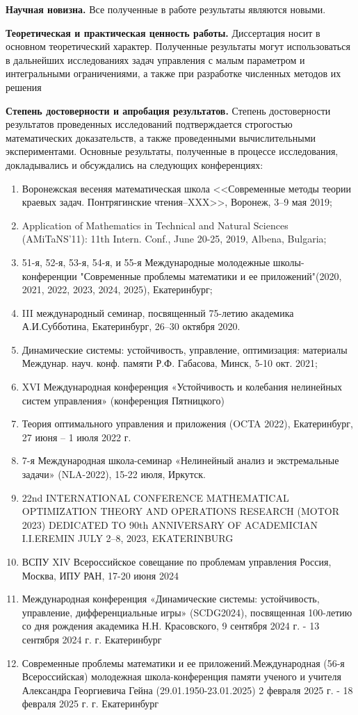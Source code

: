 \documentclass[../main.tex]{subfiles}
\begin{document}
\textbf{Научная новизна.} Все полученные в работе результаты являются новыми.

\textbf{Теоретическая и практическая ценность работы.} Диссертация носит в основном теоретический характер.
Полученные результаты могут использоваться в дальнейших исследованиях задач управления с малым параметром и интегральными ограничениями, а также при разработке численных методов их решения

\textbf{Степень достоверности и апробация результатов.}  Степень достоверности результатов проведенных исследований подтверждается строгостью математических доказательств, а также проведенными вычислительными экспериментами.
Основные результаты, полученные в процессе исследования, докладывались и обсуждались на следующих конференциях:
\begin{enumerate}
	\item Воронежская весеняя математическая школа <<Современные методы теории краевых задач. Понтрягинские чтения–XXX>>, Воронеж, 3–9 мая 2019;
	\item Application of Mathematics in Technical and Natural Sciences (AMiTaNS'11): 11th Intern. Conf., June 20-25, 2019, Albena, Bulgaria;
	\item 51-я, 52-я, 53-я, 54-я, и 55-я Международные молодежные школы-конференции "Современные проблемы математики и ее приложений"(2020, 2021, 2022, 2023, 2024, 2025), Екатеринбург;
	\item III международный семинар, посвященный 75-летию академика А.И.Субботина, Екатеринбург, 26–30 октября 2020.
	\item Динамические системы: устойчивость, управление, оптимизация: материалы Междунар. науч. конф. памяти Р.Ф. Габасова, Минск, 5-10 окт. 2021;
	\item XVI Международная конференция «Устойчивость и колебания нелинейных систем управления» (конференция Пятницкого) 
	\item Теория оптимального управления и приложения (OCTA 2022),
	Екатеринбург, 27 июня – 1 июля 2022 г.
	\item 7-я Международная школа-семинар  «Нелинейный анализ и экстремальные задачи» (NLA-2022), 15-22 июля, Иркутск.
	\item 22nd INTERNATIONAL CONFERENCE MATHEMATICAL OPTIMIZATION THEORY AND OPERATIONS RESEARCH
	(MOTOR 2023) DEDICATED TO 90th ANNIVERSARY OF ACADEMICIAN I.I.EREMIN JULY 2–8, 2023, EKATERINBURG
	\item ВСПУ  XIV Всероссийское совещание по проблемам управления Россия, Москва, ИПУ РАН, 17-20 июня 2024
	\item Международная конференция «Динамические системы: устойчивость, управление, дифференциальные игры» (SCDG2024), посвященная 100-летию со дня рождения академика Н.Н. Красовского, 9 сентября 2024 г. - 13 сентября 2024 г.  г. Екатеринбург
	\item Современные проблемы математики и ее приложений.Международная (56-я Всероссийская) молодежная школа-конференция памяти ученого и учителя Александра Георгиевича Гейна (29.01.1950-23.01.2025) 2 февраля 2025 г. - 18 февраля 2025 г.
	г. Екатеринбург
\end{enumerate}
\end{document}
